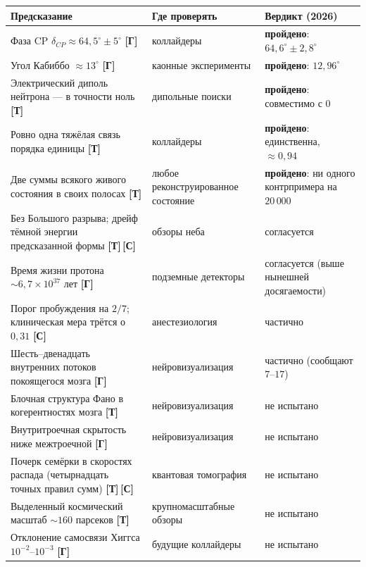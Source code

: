 \documentclass[11pt,letterpaper]{article}
\newcommand{\stT}{\textbf{[Т]}\xspace}
\newcommand{\stC}{\textbf{[С]}\xspace}
\newcommand{\stH}{\textbf{[Г]}\xspace}
\begin{document}
\begin{center}\small
\begin{tabular}{@{}p{}p{}p{}@{}}
\toprule
\textbf{Предсказание} & \textbf{Где проверять} & \textbf{Вердикт (2026)} \\
\midrule
Фаза CP $\delta_{CP}\approx 64{,}5^\circ\pm5^\circ$ \stH &
коллайдеры & \textbf{пройдено}: $64{,}6^\circ\pm2{,}8^\circ$ \\[2pt]
Угол Кабиббо $\approx 13^\circ$ \stH & каонные эксперименты &
\textbf{пройдено}: $12{,}96^\circ$ \\[2pt]
Электрический диполь нейтрона --- в точности ноль \stT & дипольные
поиски & \textbf{пройдено}: совместимо с $0$ \\[2pt]
Ровно одна тяжёлая связь порядка единицы \stT & коллайдеры &
\textbf{пройдено}: единственна, $\approx 0{,}94$ \\[2pt]
Две суммы всякого живого состояния в своих полосах \stT & любое
реконструированное состояние & \textbf{пройдено}: ни одного
контрпримера на $20\,000$ \\[2pt]
Без Большого разрыва; дрейф тёмной энергии предсказанной формы
\stT\,\stC & обзоры неба & согласуется \\[2pt]
Время жизни протона $\sim 6{,}7\times10^{37}$ лет \stH & подземные
детекторы & согласуется (выше нынешней досягаемости) \\[2pt]
Порог пробуждения на $2/7$; клиническая мера трётся о $0{,}31$
\stC & анестезиология & частично \\[2pt]
Шесть--двенадцать внутренних потоков покоящегося мозга \stH &
нейровизуализация & частично (сообщают $7$--$17$) \\[2pt]
Блочная структура Фано в когерентностях мозга \stT &
нейровизуализация & не испытано \\[2pt]
Внутритроечная скрытость ниже межтроечной \stH &
нейровизуализация & не испытано \\[2pt]
Почерк семёрки в скоростях распада (четырнадцать точных правил
сумм) \stT\,\stC & квантовая томография & не испытано \\[2pt]
Выделенный космический масштаб $\sim 160$ парсеков \stT &
крупномасштабные обзоры & не испытано \\[2pt]
Отклонение самосвязи Хиггса $10^{-2}$--$10^{-3}$ \stH & будущие
коллайдеры & не испытано \\
\bottomrule
\end{tabular}
\end{center}
\end{document}
